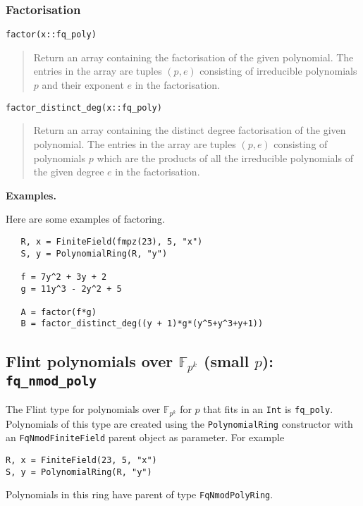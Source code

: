 \documentclass[a4paper,10pt]{article}
\newcommand{\F}{\mathbb{F}}
\newcommand{\code}{\lstinline}
\newcommand{\desc}[1]{\vspace{-3mm}\begin{quote}#1\end{quote}}
\begin{document}
{{\subsubsection{Factorisation}

\begin{lstlisting}
factor(x::fq_poly)
\end{lstlisting}

\desc{Return an array containing the factorisation of the given polynomial. The entries in
the array are tuples $(p, e)$ consisting of irreducible polynomials $p$ and their exponent
$e$ in the factorisation.}

\begin{lstlisting}
factor_distinct_deg(x::fq_poly)
\end{lstlisting}

\desc{Return an array containing the distinct degree factorisation of the given polynomial.
The entries in the array are tuples $(p, e)$ consisting of polynomials $p$ which are the
products of all the irreducible polynomials of the given degree $e$ in the factorisation.}

\textbf{Examples.}

Here are some examples of factoring.

\begin{lstlisting}
   R, x = FiniteField(fmpz(23), 5, "x")
   S, y = PolynomialRing(R, "y")

   f = 7y^2 + 3y + 2
   g = 11y^3 - 2y^2 + 5

   A = factor(f*g)
   B = factor_distinct_deg((y + 1)*g*(y^5+y^3+y+1))
\end{lstlisting}

\subsection{Flint polynomials over $\F_{p^k}$ (small $p$): \code{fq_nmod_poly}}

The Flint type for polynomials over $\F_{p^k}$ for $p$ that fits in an \code{Int} is
\code{fq_poly}. Polynomials of this type are created using the \code{PolynomialRing}
constructor with an \code{FqNmodFiniteField} parent object as parameter. For example

\begin{lstlisting}
R, x = FiniteField(23, 5, "x")
S, y = PolynomialRing(R, "y")
\end{lstlisting}

Polynomials in this ring have parent of type \code{FqNmodPolyRing}.

}}
\end{document}
